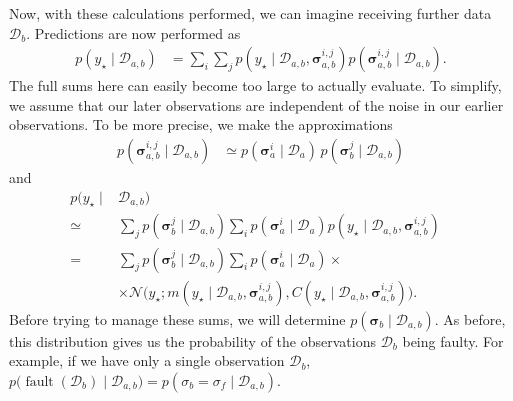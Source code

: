 \documentclass{article}
\newcommand{\given}{\ensuremath{\mid}}
\newcommand{\cm}[1]{\ensuremath{\mathcal{#1}}}
\newcommand{\bm}[1]{\ensuremath{\mathbf{#1}}}
\newcommand{\data}{\ensuremath{\cm{D}}}
\newcommand{\vect}[1]{\bm{#1}}
\newcommand{\vs}{\vect{\sigma}}
\newcommand{\p}[2]{p(#1 \given #2 )}
\newcommand{\fPr}{p}
\newcommand{\Prob}[2]{\fPr(#1 \given #2 )}
\newcommand{\mean}[2]{{m}(#1 \given #2 )}
\newcommand{\cov}[2]{{C}(#1 \given #2 )}
\newcommand{\st}{_{\star}}
\DeclareMathOperator{\fault}{fault}
\begin{document}
Now, with these calculations performed, we can imagine receiving
further data $\data_b$. Predictions are now performed as
\begin{align*}
\p{y\st}{\data_{a,b}} & = \sum_{i} \sum_{j} \p{y\st}{\data_{a,b}, \vs^{i,j}_{a,b}} \Prob{\vs^{i,j}_{a,b}}{\data_{a,b}}.
\end{align*}
The full sums here can easily become too large to actually
evaluate. To simplify, we assume that our later observations are
independent of the noise in our earlier observations. To be more
precise, we make the approximations
\begin{align} \label{eq:approx}
\Prob{\vs^{i,j}_{a,b}}{\data_{a,b}} & \simeq \Prob{\vs^i_{a}}{\data_a}\,\Prob{\vs^j_{b}}{\data_{a,b}}
\end{align}
and
\begin{align}
p(y\st \given& \data_{a,b}) &\nonumber\\
\simeq {}& \sum_{j} \Prob{\vs^j_{b}}{\data_{a,b}}\sum_{i} \Prob{\vs^i_{a}}{\data_a} \p{y\st}{\data_{a,b}, \vs^{i,j}_{a,b}}\nonumber\\
= {}&\sum_{j} \Prob{\vs^j_{b}}{\data_{a,b}}\sum_{i} \Prob{\vs^i_{a}}{\data_a}\nonumber \times {}\\
&\times \cm{N}\bigl(y\st; \mean{y\st}{\data_{a,b}, \vs^{i,j}_{a,b}}, \cov{y\st}{\data_{a,b}, \vs^{i,j}_{a,b}}\bigr).\label{eq:sum_o_Gaussians}
\end{align}
Before trying to manage these sums, we will determine $p(\vs_b \given
\data_{a,b})$. As before, this distribution gives us the probability
of the observations $\data_b$ being faulty. For example, if we have
only a single observation $\data_b$, $
p\bigl(\fault(\data_b) \given \data_{a,b}\bigr) = \Prob{\sigma_b =
  \sigma_f}{\data_{a,b}} $.
\end{document}
